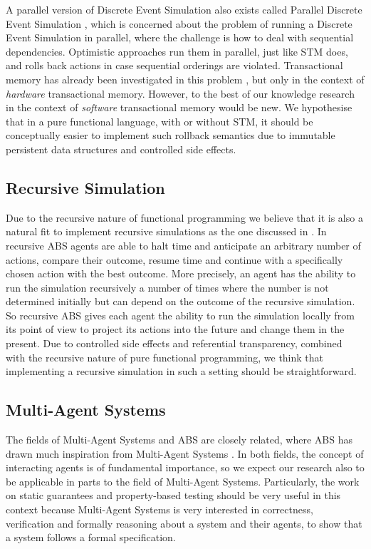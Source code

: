A parallel version of Discrete Event Simulation also exists called Parallel Discrete Event Simulation \cite{fujimoto_parallel_2017}, which is concerned about the problem of running a Discrete Event Simulation in parallel, where the challenge is how to deal with sequential dependencies. Optimistic approaches run them in parallel, just like STM does, and rolls back actions in case sequential orderings are violated. Transactional memory has already been investigated in this problem \cite{hay_experiments_2015}, but only in the context of \textit{hardware} transactional memory. However, to the best of our knowledge research in the context of \textit{software} transactional memory would be new. We hypothesise that in a pure functional language, with or without STM, it should be conceptually easier to implement such rollback semantics due to immutable persistent data structures and controlled side effects.
 
\subsection{Recursive Simulation}
Due to the recursive nature of functional programming we believe that it is also a natural fit to implement recursive simulations as the one discussed in \cite{gilmer_recursive_2000}. In recursive ABS agents are able to halt time and anticipate an arbitrary number of actions, compare their outcome, resume time and continue with a specifically chosen action with the best outcome. More precisely, an agent has the ability to run the simulation recursively a number of times where the number is not determined initially but can depend on the outcome of the recursive simulation. So recursive ABS gives each agent the ability to run the simulation locally from its point of view to project its actions into the future and change them in the present. Due to controlled side effects and referential transparency, combined with the recursive nature of pure functional programming, we think that implementing a recursive simulation in such a setting should be straightforward.

\subsection{Multi-Agent Systems}
The fields of Multi-Agent Systems and ABS are closely related, where ABS has drawn much inspiration from Multi-Agent Systems \cite{weiss_multiagent_2013,wooldridge_introduction_2009}. In both fields, the concept of interacting agents is of fundamental importance, so we expect our research also to be applicable in parts to the field of Multi-Agent Systems. Particularly, the work on static guarantees and property-based testing should be very useful in this context because Multi-Agent Systems is very interested in correctness, verification and formally reasoning about a system and their agents, to show that a system follows a formal specification.